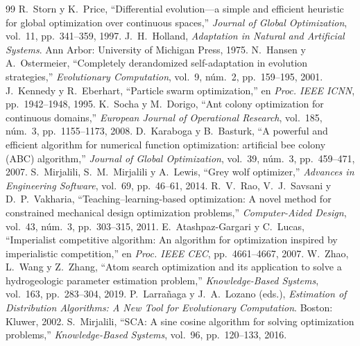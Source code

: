 \documentclass[11pt,letterpaper]{article}
\begin{document}
\begin{thebibliography}{99}
 R.~Storn y K.~Price, ``Differential evolution---a simple and efficient heuristic for global optimization over continuous spaces,'' \emph{Journal of Global Optimization}, vol.~11, pp.~341--359, 1997.
 J.~H.~Holland, \emph{Adaptation in Natural and Artificial Systems}. Ann Arbor: University of Michigan Press, 1975.
 N.~Hansen y A.~Ostermeier, ``Completely derandomized self-adaptation in evolution strategies,'' \emph{Evolutionary Computation}, vol.~9, núm.~2, pp.~159--195, 2001.
 J.~Kennedy y R.~Eberhart, ``Particle swarm optimization,'' en \emph{Proc. IEEE ICNN}, pp.~1942--1948, 1995.
 K.~Socha y M.~Dorigo, ``Ant colony optimization for continuous domains,'' \emph{European Journal of Operational Research}, vol.~185, núm.~3, pp.~1155--1173, 2008.
 D.~Karaboga y B.~Basturk, ``A powerful and efficient algorithm for numerical function optimization: artificial bee colony (ABC) algorithm,'' \emph{Journal of Global Optimization}, vol.~39, núm.~3, pp.~459--471, 2007.
 S.~Mirjalili, S.~M.~Mirjalili y A.~Lewis, ``Grey wolf optimizer,'' \emph{Advances in Engineering Software}, vol.~69, pp.~46--61, 2014.
 R.~V.~Rao, V.~J.~Savsani y D.~P.~Vakharia, ``Teaching--learning-based optimization: A novel method for constrained mechanical design optimization problems,'' \emph{Computer-Aided Design}, vol.~43, núm.~3, pp.~303--315, 2011.
 E.~Atashpaz-Gargari y C.~Lucas, ``Imperialist competitive algorithm: An algorithm for optimization inspired by imperialistic competition,'' en \emph{Proc. IEEE CEC}, pp.~4661--4667, 2007.
 W.~Zhao, L.~Wang y Z.~Zhang, ``Atom search optimization and its application to solve a hydrogeologic parameter estimation problem,'' \emph{Knowledge-Based Systems}, vol.~163, pp.~283--304, 2019.
 P.~Larrañaga y J.~A.~Lozano (eds.), \emph{Estimation of Distribution Algorithms: A New Tool for Evolutionary Computation}. Boston: Kluwer, 2002.
 S.~Mirjalili, ``SCA: A sine cosine algorithm for solving optimization problems,'' \emph{Knowledge-Based Systems}, vol.~96, pp.~120--133, 2016.
\end{thebibliography}
\end{document}
